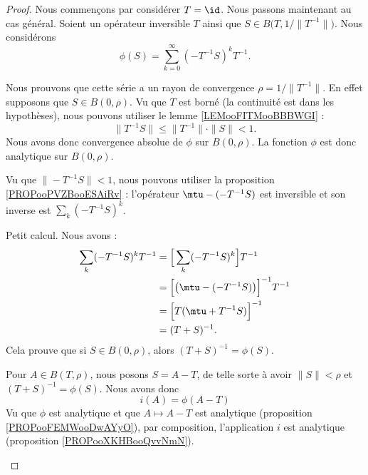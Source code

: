 \begin{proof}
	Nous commençons par considérer \( T=\id\).
	Nous passons maintenant au cas général. Soient un opérateur inversible \( T\) ainsi que \( S\in B\big( T, 1/\| T^{-1} \| \big)\). Nous considérons
	\begin{equation}
		\phi(S)=\sum_{k=0}^{\infty}(-T^{-1}S)^kT^{-1}.
	\end{equation}

	\begin{subproof}
		Nous prouvons que cette série a un rayon de convergence \( \rho=1/\| T^{-1} \|\). En effet supposons que \( S\in B(0,\rho)\). Vu que \( T\) est borné (la continuité est dans les hypothèses), nous pouvons utiliser le lemme \ref{LEMooFITMooBBBWGI} :
		\begin{equation}
			\| T^{-1}S \|\leq \| T^{-1} \|\cdot\| S \|<1.
		\end{equation}
		Nous avons donc convergence absolue de \( \phi\) sur \( B(0,\rho)\). La fonction \( \phi\) est donc analytique sur \( B(0,\rho)\).

		\spitem[Inverse]
		Vu que \( \| -T^{-1}S \|<1\), nous pouvons utiliser la proposition \ref{PROPooPVZBooESAiRv} : l'opérateur \( \mtu-(-T^{-1}S) \) est inversible et son inverse est \( \sum_k(-T^{-1}S)^k\).

		Petit calcul. Nous avons :
		\begin{subequations}
			\begin{align}
				\sum_k(-T^{-1}S)^kT^{-1} & =\Big[   \sum_k(-T^{-1}S)^k   \Big]T^{-1}             \\
				                         & =\Big[  \big( \mtu-(-T^{-1}S) \big)  \Big]^{-1}T^{-1} \\
				                         & =\Big[ T(\mtu+T^{-1}S)  \Big]^{-1}                    \\
				                         & =(T+S)^{-1}.
			\end{align}
		\end{subequations}
		Cela prouve que si \( S\in B(0,\rho)\), alors \( (T+S)^{-1}=\phi(S)\).

		\spitem[Analycité de \( i\)]
		Pour \( A\in B(T,\rho)\), nous posons \( S=A-T\), de telle sorte à avoir \( \| S \|<\rho\) et \( (T+S)^{-1}=\phi(S)\). Nous avons donc
		\begin{equation}
			i(A)=\phi(A-T)
		\end{equation}
		Vu que \( \phi\) est analytique et que \( A\mapsto A-T\) est analytique (proposition \ref{PROPooFEMWooDwAYyO}), par composition, l'application \( i\) est analytique (proposition \ref{PROPooXKHBooQvvNmN}).
	\end{subproof}
\end{proof}

